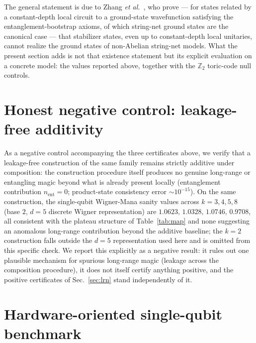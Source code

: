 \documentclass[aps,pra,twocolumn,superscriptaddress,longbibliography,floatfix,nofootinbib]{revtex4-2}
\begin{document}
The general statement is due to Zhang \emph{et al.}~\cite{Zhang2026},
who prove --- for states related by a constant-depth local circuit to a
ground-state wavefunction satisfying the entanglement-bootstrap axioms,
of which string-net ground states are the canonical case --- that
stabilizer states, even up to constant-depth local unitaries, cannot
realize the ground states of non-Abelian string-net models. What the
present section adds is not that existence statement but its explicit
evaluation on a concrete model: the values reported above, together
with the $\mathbb{Z}_2$ toric-code null controls.

\section{Honest negative control: leakage-free additivity}
\label{sec:n1}

As a negative control accompanying the three certificates above, we
verify that a leakage-free construction of the same family remains
strictly additive under composition: the construction procedure
itself produces no genuine long-range or entangling magic
beyond what is already present locally (entanglement contribution
$n_{\mathrm{ent}}=0$; product-state consistency error
$\sim10^{-15}$). On the same construction, the single-qubit Wigner-Mana
sanity values across $k=3,4,5,8$ (base $2$, $d=5$ discrete Wigner
representation) are $1.0623,\,1.0328,\,1.0746,\,0.9708$, all consistent
with the plateau structure of Table~\ref{tab:map} and none suggesting
an anomalous long-range contribution beyond the additive baseline;
the $k=2$ construction falls outside the $d=5$ representation used
here and is omitted from this specific check. We report this
explicitly as a negative result: it rules out one plausible mechanism
for spurious long-range magic (leakage across the composition
procedure), it does not itself certify anything positive, and the
positive certificates of Sec.~\ref{sec:lrn} stand independently of
it.

\section{Hardware-oriented single-qubit benchmark}
\label{sec:hw}
\end{document}
